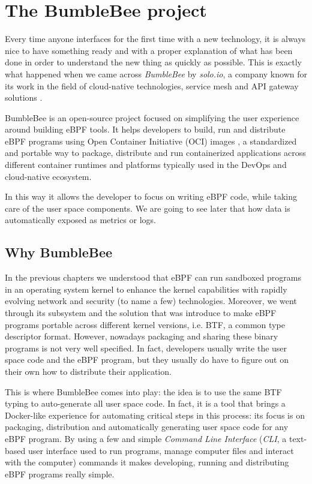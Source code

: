 \section{The BumbleBee project}

Every time anyone interfaces for the first time with a new technology, it is always nice to have something ready and with a proper explanation of what has been done in order to understand the new thing as quickly as possible.
This is exactly what happened when we came across \textit{BumbleBee} \cite{BumbleBeeWebsite} by \textit{solo.io}, a company known for its work in the field of cloud-native technologies, service mesh and API gateway solutions \cite{soloioWebsite}.

BumbleBee is an open-source project \cite{BumbleBeeRepo} focused on simplifying the user experience around building eBPF tools. 
It helps developers to build, run and distribute eBPF programs using Open Container Initiative (OCI) images \cite{OCIRepo}, a standardized and portable way to package, distribute and run containerized applications across different container runtimes and platforms typically used in the DevOps and cloud-native ecosystem.

In this way it allows the developer to focus on writing eBPF code, while taking care of the user space components.
We are going to see later that how data is automatically exposed as metrics or logs.

\subsection{Why BumbleBee}

In the previous chapters we understood that eBPF can run sandboxed programs in an operating system kernel to enhance the kernel capabilities with rapidly evolving network and security (to name a few) technologies.
Moreover, we went through its subsystem and the solution that was introduce to make eBPF programs portable across different kernel versions, i.e. BTF, a common type descriptor format.
However, nowadays packaging and sharing these binary programs is not very well specified. 
In fact, developers usually write the user space code and the eBPF program, but they usually do have to figure out on their own how to distribute their application.

This is where BumbleBee comes into play: the idea is to use the same BTF typing to auto-generate all user space code.
In fact, it is a tool that brings a Docker-like experience for automating critical steps in this process: its focus is on packaging, distribution and automatically generating user space code for any eBPF program. 
By using a few and simple \textit{Command Line Interface} (\textit{CLI}, a text-based user interface used to run programs, manage computer files and interact with the computer) commands it makes developing, running and distributing eBPF programs really simple.

